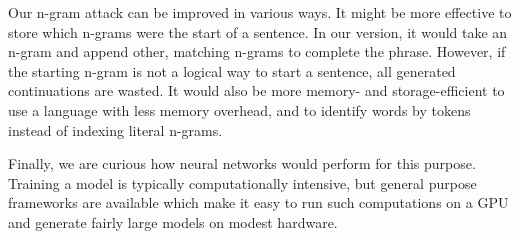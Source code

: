 \documentclass{article}
\begin{document}
Our n-gram attack can be improved in various ways. It might be more effective
to store which n-grams were the start of a sentence. In our version, it would
take an n-gram and append other, matching n-grams to complete the phrase.
However, if the starting n-gram is not a logical way to start a sentence, all
generated continuations are wasted. It would also be more memory- and
storage-efficient to use a language with less memory overhead, and to identify
words by tokens instead of indexing literal n-grams.

Finally, we are curious how neural networks would perform for this purpose.
Training a model is typically computationally intensive, but general purpose
frameworks are available which make it easy to run such computations on a GPU
and generate fairly large models on modest hardware.


\printbibliography
\end{document}
